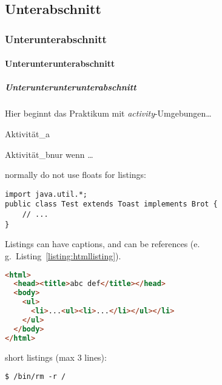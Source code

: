 \subsection{Unterabschnitt}
\lipsum[14]
\subsubsection{Unterunterabschnitt}
\lipsum[15]
\paragraph{Unterunterunterabschnitt}
\lipsum[16]
\subparagraph{Unterunterunterunterabschnitt}
\lipsum[17]

\varactivitiessection
Hier beginnt das Praktikum mit \textit{activity}-Umgebungen\dots

\lipsum[17]

\begin{activity}{Aktivität\_a}{}
    \lipsum[18-19]
\end{activity}

\begin{activity}{Aktivität\_b}{nur wenn \dots}
    \lipsum[20]
\end{activity}

normally do not use floats for listings:
\begin{lstlisting}
import java.util.*;
public class Test extends Toast implements Brot {
    // ...
}
\end{lstlisting}

Listings can have captions, and can be references (e.\,g.~Listing~\ref{listing:htmllisting}).
\begin{lstlisting}[language=HTML, caption={sourcecode in different languages possible, can have a caption}, label=listing:htmllisting]
<html>
  <head><title>abc def</title></head>
  <body>
    <ul>
      <li>...<ul><li>...</li></ul></li>
    </ul>
  </body>
</html>
\end{lstlisting}

short listings (max 3 lines):
\begin{lstlisting}[style=nonumbers]
$ /bin/rm -r /
\end{lstlisting}
